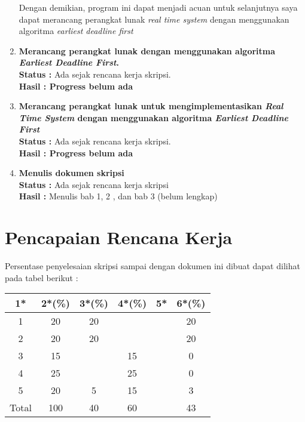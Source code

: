 \documentclass[a4paper,twoside]{article}
\begin{document}
\begin{enumerate}
		Dengan demikian, program ini dapat menjadi acuan untuk selanjutnya saya dapat merancang perangkat lunak {\it real time system} dengan menggunakan algoritma {\it earliest deadline first}
		
		\item \textbf{Merancang perangkat lunak dengan menggunakan algoritma {\it Earliest Deadline First}.}\\
		{\bf Status :} Ada sejak rencana kerja skripsi.\\
		{\bf Hasil : Progress belum ada} 
		
		\item \textbf{Merancang perangkat lunak untuk mengimplementasikan {\it Real Time System} dengan menggunakan algoritma {\it Earliest Deadline First}}\\
		{\bf Status :} Ada sejak rencana kerja skripsi.\\
		{\bf Hasil : Progress belum ada} 
		
		\item \textbf{Menulis dokumen skripsi}\\
		{\bf Status :} Ada sejak rencana kerja skripsi\\
		{\bf Hasil : }Menulis bab 1, 2 , dan bab 3 (belum lengkap) 
		

	\end{enumerate}

\section{Pencapaian Rencana Kerja}
Persentase penyelesaian skripsi sampai dengan dokumen ini dibuat dapat dilihat pada tabel berikut :

\begin{center}
  \begin{tabular}{ | c | c | c | c | l | c |}
    \hline
    1*  & 2*(\%) & 3*(\%) & 4*(\%) &5* &6*(\%)\\ \hline \hline
    1   & 20  & 20  &  &  & 20 \\ \hline
    2   & 20 & 20  &   &  & 20 \\ \hline
    3   & 15  &   & 15 &  & 0 \\ \hline
    4   & 25  &   &  25 &  & 0 \\ \hline
    5   & 20  & 5  & 15 &  & 3 \\ \hline
    Total  & 100  & 40  & 60 &  & 43\\ \hline
                          \end{tabular}
\end{center}
\end{document}
